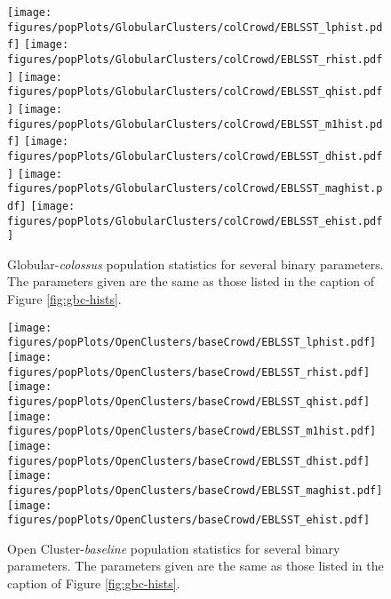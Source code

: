 \documentclass[twocolumn]{aastex63}
\begin{document}
\begin{figure*}[p]
        \centering
        \texttt{[image: figures/popPlots/GlobularClusters/colCrowd/EBLSST\_lphist.pdf]} 
        \texttt{[image: figures/popPlots/GlobularClusters/colCrowd/EBLSST\_rhist.pdf]} 
        \texttt{[image: figures/popPlots/GlobularClusters/colCrowd/EBLSST\_qhist.pdf]} 
        \texttt{[image: figures/popPlots/GlobularClusters/colCrowd/EBLSST\_m1hist.pdf]} 
        \texttt{[image: figures/popPlots/GlobularClusters/colCrowd/EBLSST\_dhist.pdf]}
        \texttt{[image: figures/popPlots/GlobularClusters/colCrowd/EBLSST\_maghist.pdf]} 
        \texttt{[image: figures/popPlots/GlobularClusters/colCrowd/EBLSST\_ehist.pdf]} 
    \caption{Globular-\textit{colossus} population statistics for several binary parameters. The parameters given are the same as those listed in the caption of Figure \ref{fig:gbc-hists}.}
    \label{fig:gcc-hists}
\end{figure*}

\begin{figure*}[p]
    \centering
    \texttt{[image: figures/popPlots/OpenClusters/baseCrowd/EBLSST\_lphist.pdf]} 
    \texttt{[image: figures/popPlots/OpenClusters/baseCrowd/EBLSST\_rhist.pdf]} 
    \texttt{[image: figures/popPlots/OpenClusters/baseCrowd/EBLSST\_qhist.pdf]} 
    \texttt{[image: figures/popPlots/OpenClusters/baseCrowd/EBLSST\_m1hist.pdf]} 
    \texttt{[image: figures/popPlots/OpenClusters/baseCrowd/EBLSST\_dhist.pdf]}
    \texttt{[image: figures/popPlots/OpenClusters/baseCrowd/EBLSST\_maghist.pdf]} 
    \texttt{[image: figures/popPlots/OpenClusters/baseCrowd/EBLSST\_ehist.pdf]} 
    
    \caption{Open Cluster-\textit{baseline}  population statistics for several binary parameters. The parameters given are the same as those listed in the caption of Figure \ref{fig:gbc-hists}.}
    \label{fig:obc-hist}
\end{figure*}
\end{document}
